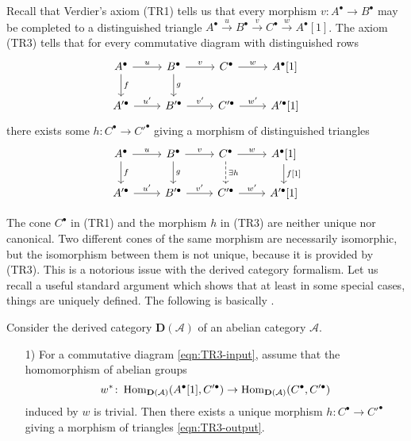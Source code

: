 \documentclass{article}
\numberwithin{equation}{section}
\begin{document}
\begin{appendices}
Recall that Verdier's axiom (TR1) tells us that every morphism
$v\colon A^\bullet \to B^\bullet$ may be completed to a distinguished triangle
$A^\bullet \xrightarrow{u} B^\bullet \xrightarrow{v} C^\bullet \xrightarrow{w} A^\bullet [1]$.
The axiom (TR3) tells that for every commutative diagram with
distinguished rows
\begin{equation}
  \label{eqn:TR3-input}
  \begin{tikzcd}
    A^\bullet\ar{r}{u}\ar{d}{f} & B^\bullet\ar{r}{v}\ar{d}{g} & C^\bullet\ar{r}{w} & A^\bullet [1] \\
    A'^\bullet\ar{r}{u'} & B'^\bullet\ar{r}{v'} & C'^\bullet\ar{r}{w'} & A'^\bullet [1]
  \end{tikzcd}
\end{equation}
there exists some $h\colon C^\bullet \to C'^\bullet$ giving a morphism of
distinguished triangles
\begin{equation}
  \label{eqn:TR3-output}
  \begin{tikzcd}
    A^\bullet\ar{r}{u}\ar{d}{f} & B^\bullet\ar{r}{v}\ar{d}{g} & C^\bullet\ar{r}{w}\ar[dashed]{d}{\exists h} & A^\bullet [1]\ar{d}{f [1]} \\
    A'^\bullet\ar{r}{u'} & B'^\bullet\ar{r}{v'} & C'^\bullet\ar{r}{w'} & A'^\bullet [1]
  \end{tikzcd}
\end{equation}

The cone $C^\bullet$ in (TR1) and the morphism $h$ in (TR3) are neither unique
nor canonical. Two different cones of the same morphism are necessarily
isomorphic, but the isomorphism between them is not unique, because it is
provided by (TR3). This is a notorious issue with the derived category
formalism. Let us recall a useful standard argument which shows that at least in
some special cases, things are uniquely defined. The following is basically
\cite[Proposition~1.1.9, Corollaire~1.1.10]{Beilinson-Bernstein-Deligne}.

\begin{lemma}
  \label{lemma:TR3-TR1-with-uniqueness-general-statement}

  Consider the derived category $\mathbf{D} (\mathcal{A})$ of an abelian
  category $\mathcal{A}$.

  \begin{enumerate}
  \item[1)] For a commutative diagram \eqref{eqn:TR3-input}, assume that the
    homomorphism of abelian groups
    \[ w^*\colon \operatorname{Hom}_{\mathbf{D} (\mathcal{A})} (A^\bullet [1], C'^\bullet) \to
    \operatorname{Hom}_{\mathbf{D} (\mathcal{A})} (C^\bullet, C'^\bullet) \]
    induced by $w$ is trivial. Then there exists a unique morphism
    $h\colon C^\bullet \to C'^\bullet$ giving a morphism of triangles
    \eqref{eqn:TR3-output}.


\end{enumerate}
\end{lemma}
\end{appendices}
\end{document}
